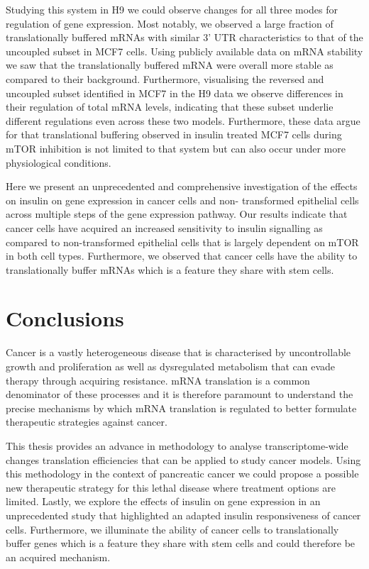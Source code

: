 \documentclass[
  12pt,
  openany]{book}
\begin{document}
Studying this system in H9 we could observe changes for all three modes for regulation of gene expression. Most notably, we observed a large fraction of translationally buffered mRNAs with similar 3' UTR characteristics to that of the uncoupled subset in MCF7 cells. Using publicly available data on mRNA stability we saw that the translationally buffered mRNA were overall more stable as compared to their background. Furthermore, visualising the reversed and uncoupled subset identified in MCF7 in the H9 data we observe differences in their regulation of total mRNA levels, indicating that these subset underlie different regulations even across these two models. Furthermore, these data argue for that translational buffering observed in insulin treated MCF7 cells during mTOR inhibition is not limited to that system but can also occur under more physiological conditions.

Here we present an unprecedented and comprehensive investigation of the effects on insulin on gene expression in cancer cells and non- transformed epithelial cells across multiple steps of the gene expression pathway. Our results indicate that cancer cells have acquired an increased sensitivity to insulin signalling as compared to non-transformed epithelial cells that is largely dependent on mTOR in both cell types. Furthermore, we observed that cancer cells have the ability to translationally buffer mRNAs which is a feature they share with stem cells.

\chapter{Conclusions}

Cancer is a vastly heterogeneous disease that is characterised by uncontrollable growth and proliferation as well as dysregulated metabolism that can evade therapy through acquiring resistance. mRNA translation is a common denominator of these processes and it is therefore paramount to understand the precise mechanisms by which mRNA translation is regulated to better formulate therapeutic strategies against cancer.

This thesis provides an advance in methodology to analyse transcriptome-wide changes translation efficiencies that can be applied to study cancer models. Using this methodology in the context of pancreatic cancer we could propose a possible new therapeutic strategy for this lethal disease where treatment options are limited. Lastly, we explore the effects of insulin on gene expression in an unprecedented study that highlighted an adapted insulin responsiveness of cancer cells. Furthermore, we illuminate the ability of cancer cells to translationally buffer genes which is a feature they share with stem cells and could therefore be an acquired mechanism.
\end{document}
